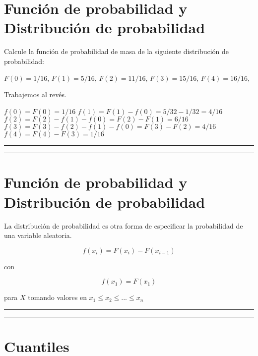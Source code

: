 \documentclass[
]{book}
\begin{document}
\hypertarget{funciuxf3n-de-probabilidad-y-distribuciuxf3n-de-probabilidad}{%
\section{Función de probabilidad y Distribución de probabilidad}\label{funciuxf3n-de-probabilidad-y-distribuciuxf3n-de-probabilidad}}

Calcule la función de probabilidad de masa de la siguiente distribución de probabilidad:

\(F(0)=1/16\), \(F(1)=5/16\), \(F(2)=11/16\), \(F(3)=15/16\), \(F(4)= 16/16\),

Trabajemos al revés.

\(f(0)=F(0)=1/16\)
\(f(1)=F(1)-f(0)=5/32-1/32=4/16\)
\(f(2)=F(2)-f(1)-f(0)=F(2)-F(1)=6/16\)
\(f(3)=F(3)-f(2)-f(1)-f(0)=F(3)-F(2)=4/16\)
\(f(4)=F(4)-F(3)=1/16\)

\begin{center}\rule{0.5\linewidth}{0.5pt}\end{center}

\begin{center}\rule{0.5\linewidth}{0.5pt}\end{center}

\hypertarget{funciuxf3n-de-probabilidad-y-distribuciuxf3n-de-probabilidad-1}{%
\section{Función de probabilidad y Distribución de probabilidad}\label{funciuxf3n-de-probabilidad-y-distribuciuxf3n-de-probabilidad-1}}

La distribución de probabilidad es otra forma de especificar la probabilidad de una variable aleatoria.

\[f(x_i)=F(x_i)-F(x_{i-1})\]

con

\[f(x_1)=F(x_1)\]

para \(X\) tomando valores en \(x_1 \leq x_2 \leq ... \leq x_n\)

\begin{center}\rule{0.5\linewidth}{0.5pt}\end{center}

\begin{center}\rule{0.5\linewidth}{0.5pt}\end{center}

\hypertarget{cuantiles}{%
\section{Cuantiles}\label{cuantiles}}
\end{document}
